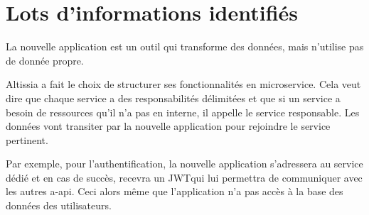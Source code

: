\section{Lots d'informations identifiés}
\label{sec:identified-information-packages}
La nouvelle application est un outil qui transforme des données, mais n'utilise pas de donnée propre.

Altissia a fait le choix de structurer ses fonctionnalités en microservice.
Cela veut dire que chaque service a des responsabilités délimitées et que si un service a besoin de ressources qu'il n'a pas en interne, il appelle le service responsable.
Les données vont transiter par la nouvelle application pour rejoindre le service pertinent.

Par exemple, pour l'authentification, la nouvelle application s'adressera au service dédié et en cas de succès, recevra un JWT\fnmark qui lui permettra de communiquer avec les autres \gls{a-api}.
Ceci alors même que l'application n'a pas accès à la base des données des utilisateurs.
